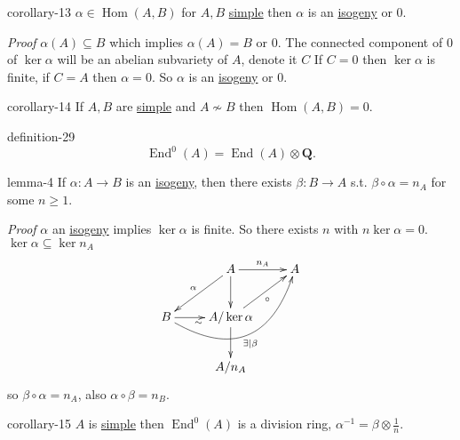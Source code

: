 \documentclass[10pt,]{book}
\makeatletter
\renewcommand*{\proofname}{Proof}
\renewenvironment{proof}[1][\proofname]{\par
  \pushQED{\qed}%
  \normalfont \topsep6\p@\@plus6\p@\relax
  \trivlist
  \item\relax
    {\itshape
    #1\@addpunct{.}}\hspace\labelsep\ignorespaces
}{%
  \popQED\endtrivlist\@endpefalse
}
\numberwithin{equation}{section}
\newcommand{\QQ}{\mathbf{Q}}
\DeclareMathOperator{\End}{End}
\DeclareMathOperator{\Hom}{Hom}
\makeatother
\begin{document}
\begin{corollary}{}{}{corollary-13}%
\hypertarget{p-214}{}%
\(\alpha \in \Hom(A,B)\) for \(A,B\) \hyperref[def-simple-av]{simple} then \(\alpha\) is an \hyperref[def-supersing-isog-isog]{isogeny} or \(0\).%
\end{corollary}
\begin{proof}\hypertarget{proof-39}{}
\hypertarget{p-215}{}%
\(\alpha(A) \subseteq B\) which implies \(\alpha(A)  = B\) or \(0\). The connected component of 0 of \(\ker \alpha\) will be an abelian subvariety of \(A\), denote it \(C\) If \(C = 0\) then \(\ker \alpha\) is finite, if \(C = A\) then \(\alpha = 0\). So \(\alpha\) is an \hyperref[def-supersing-isog-isog]{isogeny} or \(0\).%
\end{proof}
\begin{corollary}{}{}{corollary-14}%
\hypertarget{p-216}{}%
If \(A,B\) are \hyperref[def-simple-av]{simple} and  \(A\not\sim B\) then \(\Hom(A,B) = 0\).%
\end{corollary}
\begin{definition}{}{definition-29}%
\hypertarget{p-217}{}%
%
\begin{equation*}
\End^0(A) = \End(A) \otimes \QQ\text{.}
\end{equation*}
%
\end{definition}
\begin{lemma}{}{}{lemma-4}%
\hypertarget{p-218}{}%
If \(\alpha \colon A\to B\) is an \hyperref[def-supersing-isog-isog]{isogeny}, then there exists \(\beta \colon B\to A\) s.t. \(\beta \circ \alpha = n_A\) for some \(n \ge 1\).%
\end{lemma}
\begin{proof}\hypertarget{proof-40}{}
\hypertarget{p-219}{}%
\(\alpha\) an \hyperref[def-supersing-isog-isog]{isogeny} implies \(\ker \alpha\) is finite. So there exists \(n\) with \(n \ker \alpha = 0\). \(\ker\alpha \subseteq \ker n_A\)%
\begin{equation*}
\xymatrix{
& A \ar[dl]_\alpha \ar[d]\ar[r]^{n_A} & A \\
B\ar[r]_\sim \ar@/_3.0pc/[urr]_{\exists | \beta} & A/\ker\alpha \ar[d]\ar[ur]_{\circ} &\\
& A/n_A &
}
\end{equation*}
so \(\beta\circ \alpha = n_A\), also \(\alpha \circ \beta = n_B\).%
\end{proof}
\begin{corollary}{}{}{corollary-15}%
\hypertarget{p-220}{}%
\(A\) is \hyperref[def-simple-av]{simple} then \(\End^0(A)\) is a division ring, \(\alpha^{-1} = \beta \otimes \frac 1n\).%
\end{corollary}
\end{document}
